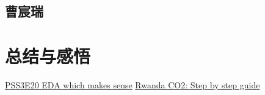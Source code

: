 \documentclass[fontset=windows]{ctexart}
\begin{document}
\subsection{曹宸瑞}

\section{总结与感悟}

\begin{thebibliography}{100}
\href{https://www.kaggle.com/code/ambrosm/pss3e20-eda-which-makes-sense}{PSS3E20 EDA which makes sense}
\href{https://www.kaggle.com/code/kacperrabczewski/rwanda-co2-step-by-step-guide}{Rwanda CO2: Step by step guide}
\end{thebibliography}
\end{document}
